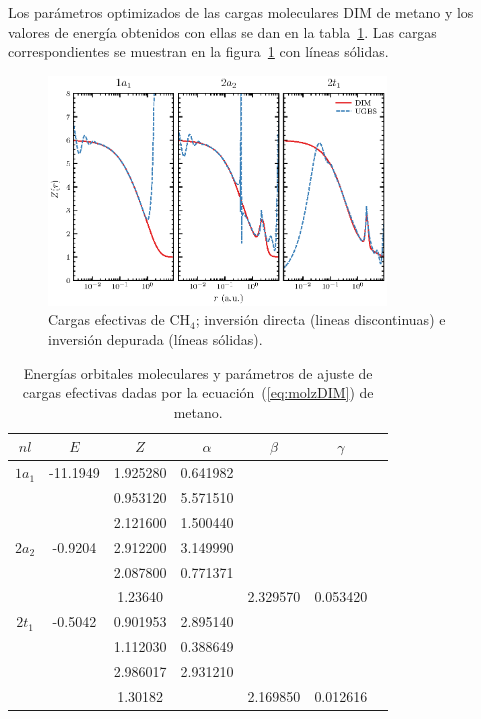 Los parámetros optimizados de las cargas moleculares DIM de metano y los
valores de energía obtenidos con ellas se dan en la 
tabla~\ref{tab:ch4parameters}. Las cargas correspondientes se muestran 
en la figura~\ref{fig:ch4zeff} con líneas sólidas. 

\begin{figure}
\centering
\includegraphics[width=0.8\textwidth]{figures/dim/ch4_dim.eps}
\caption[Cargas efectivas DIM de metano.]
{Cargas efectivas de CH$_4$; inversión directa (lineas discontinuas)
e inversión depurada (líneas sólidas).}
\label{fig:ch4zeff}
\end{figure}

\begin{table}
\centering
\begin{tabular}{cc|ccccc}
\hline
   $nl$ & $E$ &$Z$ & $\alpha$ & $\beta$ & $\gamma$ \\
\hline
   $1a_1$ & -11.1949  & 1.925280 & 0.641982 & & \\
          & & 0.953120 & 5.571510 & & \\
          & & 2.121600 & 1.500440 & & \\
   $2a_2$ & -0.9204 & 2.912200 & 3.149990 & & \\
          & & 2.087800 & 0.771371 & & \\
          & & 1.23640  &          & 2.329570 & 0.053420 \\
   $2t_1$ & -0.5042 & 0.901953 & 2.895140 & & \\
          & & 1.112030 & 0.388649 & & \\
          & & 2.986017 & 2.931210 & & \\
          & & 1.30182  &          & 2.169850 & 0.012616 \\
\hline
\end{tabular}
\caption[Energías y parámetros de ajuste de cargas efectivas de metano.]
{Energías orbitales moleculares y parámetros de ajuste de cargas efectivas
dadas por la ecuación~(\ref{eq:molzDIM}) de metano.}
\label{tab:ch4parameters}
\end{table}

